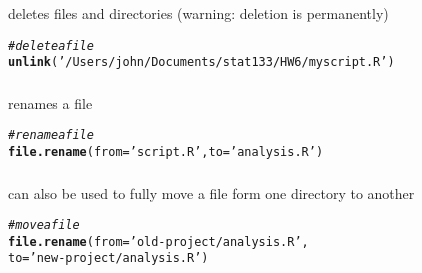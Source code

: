\documentclass[12pt]{beamer}\usepackage[]{graphicx}\usepackage[]{color}
\makeatletter
\newcommand{\hlstr}[1]{\textcolor[rgb]{0.192,0.494,0.8}{#1}}%
\newcommand{\hlcom}[1]{\textcolor[rgb]{0.678,0.584,0.686}{\textit{#1}}}%
\newcommand{\hlstd}[1]{\textcolor[rgb]{0.345,0.345,0.345}{#1}}%
\newcommand{\hlkwc}[1]{\textcolor[rgb]{0.333,0.667,0.333}{#1}}%
\newcommand{\hlkwd}[1]{\textcolor[rgb]{0.737,0.353,0.396}{\textbf{#1}}}%
\newenvironment{kframe}{%
 \def\at@end@of@kframe{}%
 \ifinner\ifhmode%
  \def\at@end@of@kframe{\end{minipage}}%
  \begin{minipage}{\columnwidth}%
 \fi\fi%
 \def\FrameCommand##1{\hskip\@totalleftmargin \hskip-\fboxsep
 \colorbox{shadecolor}{##1}\hskip-\fboxsep
     \hskip-\linewidth \hskip-\@totalleftmargin \hskip\columnwidth}%
 \MakeFramed {\advance\hsize-\width
   \@totalleftmargin\z@ \linewidth\hsize
   \@setminipage}}%
 {\par\unskip\endMakeFramed%
 \at@end@of@kframe}
\newenvironment{knitrout}{}{} %
\makeatother
\begin{document}

\begin{frame}[fragile]
\frametitle{}

{\hilit {}} deletes files and directories (warning: deletion is permanently)
\begin{knitrout}\footnotesize
{}\color{fgcolor}\begin{kframe}
\begin{alltt}
\hlcom{# delete a file}
\hlkwd{unlink}\hlstd{(}\hlstr{'/Users/john/Documents/stat133/HW6/myscript.R'}\hlstd{)}
\end{alltt}
\end{kframe}
\end{knitrout}

\end{frame}


\begin{frame}[fragile]
\frametitle{}

{\hilit {}} renames a file
\begin{knitrout}\footnotesize
{}\color{fgcolor}\begin{kframe}
\begin{alltt}
\hlcom{# rename a file}
\hlkwd{file.rename}\hlstd{(}\hlkwc{from} \hlstd{=} \hlstr{'script.R'}\hlstd{,} \hlkwc{to} \hlstd{=} \hlstr{'analysis.R'}\hlstd{)}
\end{alltt}
\end{kframe}
\end{knitrout}

\end{frame}


\begin{frame}[fragile]
\frametitle{}

{\hilit {}} can also be used to fully move a file form one directory to another
\begin{knitrout}\footnotesize
{}\color{fgcolor}\begin{kframe}
\begin{alltt}
\hlcom{# move a file}
\hlkwd{file.rename}\hlstd{(}\hlkwc{from} \hlstd{=} \hlstr{'old-project/analysis.R'}\hlstd{,}
            \hlkwc{to} \hlstd{=} \hlstr{'new-project/analysis.R'}\hlstd{)}
\end{alltt}
\end{kframe}
\end{knitrout}

\end{frame}
\end{document}
